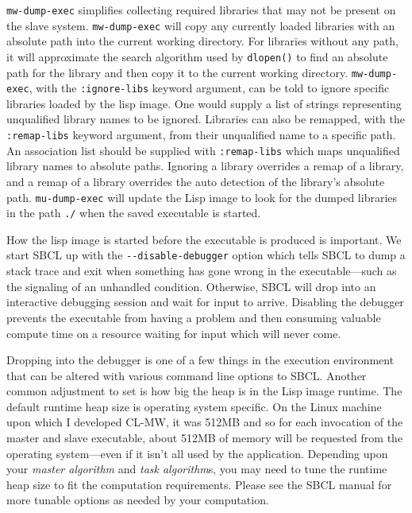 \documentclass[titlepage,12pt]{book}
\newcommand{\xsmall}{\latexhtml{\small}{}}
\newcommand{\xnormalsize}{\latexhtml{\normalsize}{}}
\newcommand{\sbcl}{SBCL\xspace}
\newcommand{\clmw}{\xsmall\textsc{CL-MW}\xnormalsize\xspace}
\newcommand{\ma}{\textit{master algorithm}\xspace}
\newcommand{\tas}{\textit{task algorithm}s\xspace}
\newcommand{\dash}{\texttt{-}}
\newcommand{\func}[1]{\mbox{\texttt{#1}}\xspace}
\newcommand{\syscall}[1]{\mbox{\texttt{#1()}}\xspace}
\newcommand{\file}[1]{\texttt{#1}\xspace}
\newcommand{\Option}[1]{\dash\dash\texttt{#1}}
\newcommand{\keyword}[1]{\texttt{:#1}\xspace}
\begin{document}
\func{mw-dump-exec} simplifies collecting required libraries that
may not be present on the slave system.  \func{mw-dump-exec} will
copy any currently loaded libraries with an absolute path into the
current working directory. For libraries without any path, it will
approximate the search algorithm used by \syscall{dlopen} to find an
absolute path for the library and then copy it to the current working
directory. \func{mw-dump-exec}, with the \keyword{ignore-libs} keyword
argument, can be told to ignore specific libraries loaded by the lisp
image. One would supply a list of strings representing unqualified
library names to be ignored. Libraries can also be remapped, with
the \keyword{remap-libs} keyword argument, from their unqualified
name to a specific path. An association list should be supplied
with \keyword{remap-libs} which maps unqualified library names to
absolute paths. Ignoring a library overrides a remap of a library,
and a remap of a library overrides the auto detection of the library's
absolute path.  \func{mu-dump-exec} will update the Lisp image to
look for the dumped libraries in the path \file{./} when the saved
executable is started.

How the lisp image is started before the executable is produced is
important.  We start \sbcl up with the \Option{disable-debugger} option
which tells \sbcl to dump a stack trace and exit when something has
gone wrong in the executable---such as the signaling of an unhandled
condition. Otherwise, \sbcl will drop into an interactive debugging
session and wait for input to arrive. Disabling the debugger prevents
the executable from having a problem and then consuming valuable
compute time on a resource waiting for input which will never come.

Dropping into the debugger is one of a few things in the execution
environment that can be altered with various command line options
to \sbcl. Another common adjustment to set is how big the heap is in
the Lisp image runtime.  The default runtime heap size is operating
system specific. On the Linux machine upon which I developed \clmw,
it was 512MB and so for each invocation of the master and slave
executable, about 512MB of memory will be requested from the operating
system---even if it isn't all used by the application. Depending upon
your \ma and \tas, you may need to tune the runtime heap size to fit
the computation requirements. Please see the \sbcl manual for more
tunable options as needed by your computation.
\end{document}
